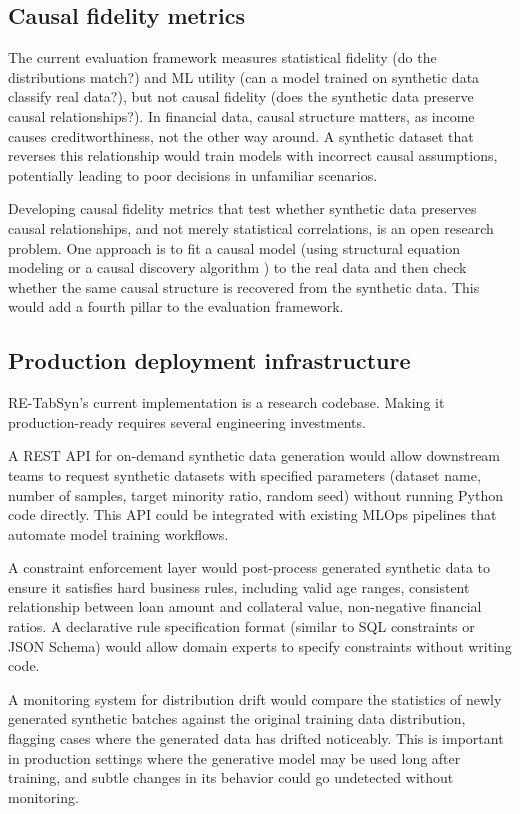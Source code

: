 \subsection{Causal fidelity metrics}

The current evaluation framework measures statistical fidelity (do the distributions match?) and ML utility (can a model trained on synthetic data classify real data?), but not causal fidelity (does the synthetic data preserve causal relationships?). In financial data, causal structure matters, as income causes creditworthiness, not the other way around. A synthetic dataset that reverses this relationship would train models with incorrect causal assumptions, potentially leading to poor decisions in unfamiliar scenarios.

Developing causal fidelity metrics that test whether synthetic data preserves causal relationships, and not merely statistical correlations, is an open research problem. One approach is to fit a causal model (using structural equation modeling or a causal discovery algorithm \cite{zheng2024causal}) to the real data and then check whether the same causal structure is recovered from the synthetic data. This would add a fourth pillar to the evaluation framework.

\subsection{Production deployment infrastructure}

RE-TabSyn's current implementation is a research codebase. Making it production-ready requires several engineering investments.

A REST API for on-demand synthetic data generation would allow downstream teams to request synthetic datasets with specified parameters (dataset name, number of samples, target minority ratio, random seed) without running Python code directly. This API could be integrated with existing MLOps pipelines that automate model training workflows.

A constraint enforcement layer would post-process generated synthetic data to ensure it satisfies hard business rules, including valid age ranges, consistent relationship between loan amount and collateral value, non-negative financial ratios. A declarative rule specification format (similar to SQL constraints or JSON Schema) would allow domain experts to specify constraints without writing code.

A monitoring system for distribution drift would compare the statistics of newly generated synthetic batches against the original training data distribution, flagging cases where the generated data has drifted noticeably. This is important in production settings where the generative model may be used long after training, and subtle changes in its behavior could go undetected without monitoring.

